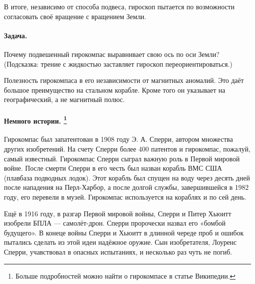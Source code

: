 В итоге, независимо от способа подвеса, гироскоп пытается по возможности согласовать своё вращение с вращением Земли.

\paragraph{Задача.} Почему подвешенный гирокомпас выравнивает свою ось по оси Земли?
(Подсказка: трение с жидкостью заставляет гироскоп переориентироваться.)

Полезность гирокомпаса в его независимости от магнитных аномалий.
Это даёт большое преимущество на стальном корабле.
Кроме того он указывает на географический, а не магнитный полюс.

\paragraph[Немного истории.]%
{Немного истории.%
\footnote{Больше подробностей можно найти о гирокомпасе в статье Википедии.}
}
Гирокомпас был запатентован в 1908 году Э. А. Сперри, автором множества других изобретений.
На счету Сперри более 400 патентов и гирокомпас, пожалуй, самый известный.
Гирокомпас Сперри сыграл важную роль в Первой мировой войне.
После смерти Сперри в его честь был назван корабль ВМС США (плавбаза подводных лодок).
Этот корабль был спущен на воду через десять дней после нападения на Перл-Харбор, а после долгой службы, завершившейся в 1982 году, его перевели в музей.
Гирокомпас используется на кораблях и по сей день.

Ещё в 1916 году, в разгар Первой мировой войны,
Сперри и Питер Хьюитт изобрели БПЛА --- самолёт-дрон.
Сперри пророчески назвал его «бомбой будущего».
В конеце войны Сперри и Хьюитт в длинной череде проб и ошибок пытались сделать из этой идеи надёжное оружие.
Сын изобретателя, Лоуренс Сперри, учавствовал в опасных испытаниях, и несколько раз чуть не погиб.
